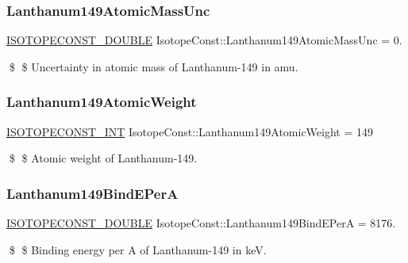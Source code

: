 \subsubsection{\texorpdfstring{Lanthanum149\+Atomic\+Mass\+Unc}{Lanthanum149AtomicMassUnc}}
{\footnotesize\ttfamily \mbox{\hyperlink{group___isotope_const-_macros_ga8f45a7272ce02c0b4c65c44636ed719a}{I\+S\+O\+T\+O\+P\+E\+C\+O\+N\+S\+T\+\_\+\+D\+O\+U\+B\+LE}} Isotope\+Const\+::\+Lanthanum149\+Atomic\+Mass\+Unc = 0.}

\$ \$ Uncertainty in atomic mass of Lanthanum-\/149 in amu. \mbox{\label{group___isotope_const-_lanthanum-_la149_ga8f85479fca0df317d475423debfd08c6}} 
\subsubsection{\texorpdfstring{Lanthanum149\+Atomic\+Weight}{Lanthanum149AtomicWeight}}
{\footnotesize\ttfamily \mbox{\hyperlink{group___isotope_const-_macros_ga5f18360b3e99483a35c32d789e62621c}{I\+S\+O\+T\+O\+P\+E\+C\+O\+N\+S\+T\+\_\+\+I\+NT}} Isotope\+Const\+::\+Lanthanum149\+Atomic\+Weight = 149}

\$ \$ Atomic weight of Lanthanum-\/149. \mbox{\label{group___isotope_const-_lanthanum-_la149_ga512bcdcf18030ac21c98f07a3275d474}} 
\subsubsection{\texorpdfstring{Lanthanum149\+Bind\+E\+PerA}{Lanthanum149BindEPerA}}
{\footnotesize\ttfamily \mbox{\hyperlink{group___isotope_const-_macros_ga8f45a7272ce02c0b4c65c44636ed719a}{I\+S\+O\+T\+O\+P\+E\+C\+O\+N\+S\+T\+\_\+\+D\+O\+U\+B\+LE}} Isotope\+Const\+::\+Lanthanum149\+Bind\+E\+PerA = 8176.}

\$ \$ Binding energy per A of Lanthanum-\/149 in keV. \mbox{\label{group___isotope_const-_lanthanum-_la149_ga2fdc98f4af8b0438a672bef8a5de6c14}} 

